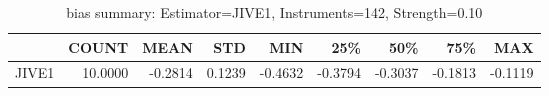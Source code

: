 \begin{table}[ht]
\centering
\caption{bias summary: Estimator=JIVE1, Instruments=142, Strength=0.10}
\begin{tabular}{lrrrrrrrr}
\toprule
 & COUNT & MEAN & STD & MIN & 25\% & 50\% & 75\% & MAX \\
\midrule
JIVE1 & 10.0000 & -0.2814 & 0.1239 & -0.4632 & -0.3794 & -0.3037 & -0.1813 & -0.1119 \\
\bottomrule
\end{tabular}
\end{table}
